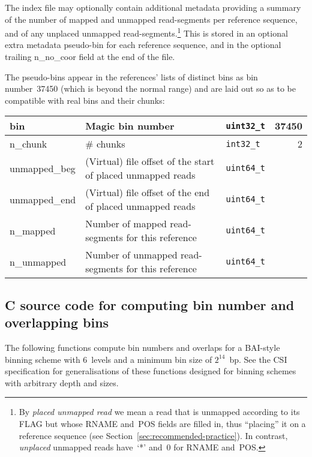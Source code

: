\documentclass[10pt]{article}
\begin{document}
The index file may optionally contain additional metadata providing a summary
of the number of mapped and unmapped read-segments per reference sequence,
and of any unplaced unmapped read-segments.\footnote{By \emph{placed unmapped
read} we mean a read that is unmapped according to its {\sf FLAG} but whose
{\sf RNAME} and~{\sf POS} fields are filled in, thus ``placing'' it on a
reference sequence (see Section~\ref{sec:recommended-practice}).
In contrast, \emph{unplaced} unmapped reads have~`*' and~0 for {\sf RNAME}
and~{\sf POS}.}
This is stored in an optional extra metadata pseudo-bin for each reference
sequence, and in the optional trailing {\sf n\_no\_coor} field at the end of
the file.

The pseudo-bins appear in the references' lists of distinct bins as bin
number~37450 (which is beyond the normal range) and are laid out so as to be
compatible with real bins and their chunks:

\begin{table}[ht]
\centering\small
\begin{tabular}{|l|l|l|r|}
  \hline
  {\sf bin} & Magic bin number & {\tt uint32\_t} & 37450 \\\hline
  {\sf n\_chunk} & \# chunks & {\tt int32\_t} & 2 \\\hline
  {\sf unmapped\_beg} & (Virtual) file offset of the start of placed unmapped reads & {\tt uint64\_t} & \\\hline
  {\sf unmapped\_end} & (Virtual) file offset of the end of placed unmapped reads & {\tt uint64\_t} & \\\hline
  {\sf n\_mapped} & Number of mapped read-segments for this reference & {\tt uint64\_t} & \\\hline
  {\sf n\_unmapped} & Number of unmapped read-segments for this reference & {\tt uint64\_t} & \\\hline
\end{tabular}
\end{table}

\subsection{C source code for computing bin number and overlapping bins}\label{sec:code}
The following functions compute bin numbers and overlaps for a BAI-style
binning scheme with $6$~levels and a minimum bin size of $2^{14}$~bp.
See the CSI specification for generalisations of these functions designed for
binning schemes with arbitrary depth and sizes.
\end{document}
